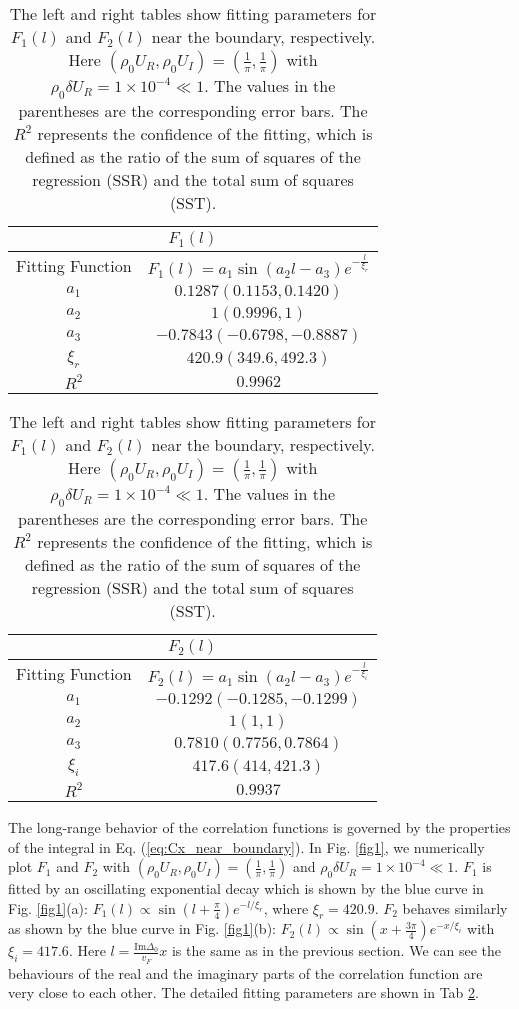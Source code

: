 \documentclass[aps,onecolumn,nofootinbib,superscriptaddress,notitlepage,longbibliography]{revtex4-1}
\begin{document}
\begin{table}
	\begin{tabular}{|c|c|}
		\hline 
		\multicolumn{2}{|c|}{$F_{1}(l)$}\tabularnewline		
		\hline
		\hline 
		Fitting Function & $F_1(l)=a_{1}\sin(a_{2}l-a_{3})e^{-\frac{l}{\xi_{r}}}$\tabularnewline
		\hline 
		$a_{1}$ & $0.1287(0.1153,0.1420)$\tabularnewline
		\hline 
		$a_{2}$ & $1(0.9996,1)$\tabularnewline
		\hline 
		$a_{3}$ & $-0.7843(-0.6798,-0.8887)$\tabularnewline
		\hline 
		$\xi_{r}$ & $420.9(349.6,492.3)$\tabularnewline
		\hline 
		$R^{2}$ & $0.9962$\tabularnewline
		\hline 
	\end{tabular}%
	\begin{tabular}{|c|c|}
		\hline 
		\multicolumn{2}{|c|}{$F_{2}(l)$}\tabularnewline
		\hline
		\hline 
		Fitting Function & $F_2(l)=a_{1}\sin(a_{2}l-a_{3})e^{-\frac{l}{\xi_i}}$\tabularnewline
		\hline 
		$a_{1}$ & $-0.1292(-0.1285,-0.1299)$\tabularnewline
		\hline 
		$a_{2}$ & $1(1,1)$\tabularnewline
		\hline 
		$a_{3}$ & $0.7810(0.7756,0.7864)$\tabularnewline
		\hline 
		$\xi_{i}$ & $417.6(414,421.3)$\tabularnewline
		\hline 
		$R^{2}$ & $0.9937$\tabularnewline
		\hline 
	\end{tabular}
	
	\caption{The left and right tables show fitting parameters for $F_1(l)$ and $F_2(l)$ near the boundary, respectively. Here $(\rho_{0}U_{R},\rho_{0}U_{I})=(\frac{1}{\pi},\frac{1}{\pi})$ with $\rho_{0}\delta U_{R}=1\times10^{-4}\ll1$. The values in the parentheses are the corresponding error bars. The $R^2$ represents the confidence of the fitting, which is defined as the ratio of the sum of squares of the regression (SSR) and the total sum of squares (SST).}
	\label{Fitting_table_1}
\end{table}
The long-range behavior of the correlation functions is governed by the properties of the integral in Eq. (\ref{eq:Cx_near_boundary}). In Fig. \ref{fig1}, we numerically plot $F_1$ and $F_2$ with $(\rho_{0}U_{R},\rho_{0}U_{I})=(\frac{1}{\pi},\frac{1}{\pi})$ and $\rho_{0}\delta U_{R}=1\times10^{-4}\ll1$. $F_1$ is fitted by an oscillating exponential decay  which is shown by the blue curve
in Fig. \ref{fig1}(a): $F_1(l)\propto\sin(l+\frac{\pi}{4})e^{-l/\xi_{r}}$,
where $\xi_{r}=420.9$. $F_2$ behaves similarly as
shown by the blue curve in Fig. \ref{fig1}(b): $F_2(l) \propto\sin(x+\frac{3\pi}{4})e^{-x/\xi_{i}}$
with $\xi_{i}=417.6$. Here $l=\frac{\text{Im}\Delta_0}{v_F}x$ is the same as in the previous section. We can see the behaviours of the real and the
imaginary parts of the correlation function are very close
to each other. The detailed fitting parameters are shown in Tab \ref{Fitting_table_1}.
\end{document}
